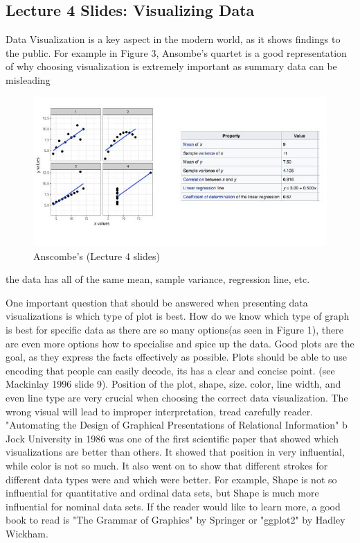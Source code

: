 \subsection{Lecture 4 Slides: Visualizing Data}
Data Visualization is a key aspect in the modern world, as it shows findings to the public.  For example in Figure 3, Ansombe's quartet is a good representation of why choosing visualization is extremely important as summary data can be misleading \begin{figure}[h!]
  \caption{ Anscombe's (Lecture 4 slides)}
  \includegraphics[width=\textwidth]{figures/MSDimage3}
\end{figure} the data has all of the same mean, sample variance, regression line, etc.

One important question that should be answered when presenting data visualizations is which type of plot is best. How do we know which type of graph is best for specific data as there are so many options(as seen in Figure 1), there are even more options how to specialise and spice up the data. Good plots are the goal, as they express the facts effectively as possible. Plots should be able to use encoding that people can easily decode, its has a clear and concise point. (see Mackinlay 1996 slide 9). Position of the plot, shape, size. color, line width, and even line type are very crucial when choosing the correct data visualization. The wrong visual will lead to improper interpretation, tread carefully reader. "Automating the Design of Graphical Presentations of Relational Information" b Jock University in 1986 was one of the first scientific paper that showed which visualizations are better than others. It showed that position in very influential, while color is not so much. It also went on to show that different strokes for different data types were and which were better. For example, Shape is not so influential for quantitative and ordinal data sets, but Shape is much more influential for nominal data sets. If the reader would like to learn more, a good book to read is "The Grammar of Graphics" by Springer or "ggplot2" by Hadley Wickham.
